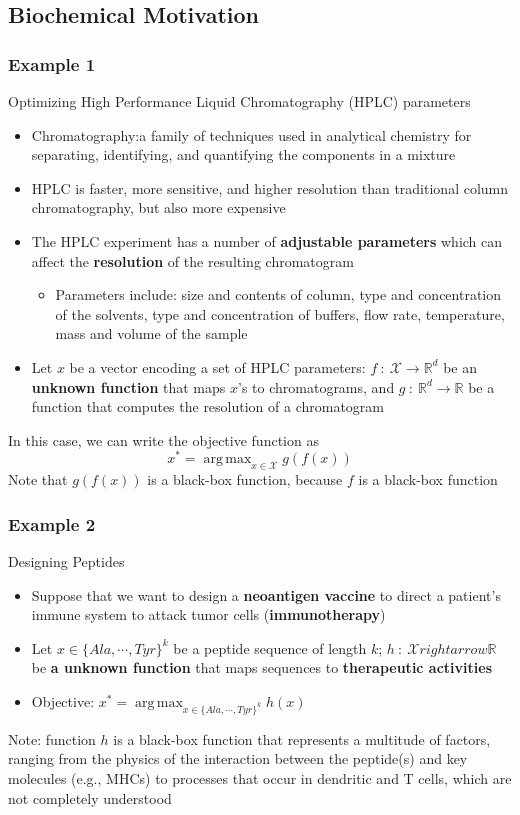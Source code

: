 \documentclass[10pt]{article}
\DeclareMathOperator*{\argmax}{arg\,max}
\begin{document}
\subsection*{Biochemical Motivation}
\subsubsection*{Example 1}
Optimizing High Performance Liquid Chromatography (HPLC) parameters
\begin{itemize}
	\item Chromatography:a family of techniques used in analytical chemistry for separating, identifying, and quantifying the components in a mixture
	\item HPLC is faster, more sensitive, and higher resolution than traditional column chromatography, but also more expensive
	\item The HPLC experiment has a number of \textbf{adjustable parameters} which can affect the \textbf{resolution} of the resulting chromatogram
	\begin{itemize}
	    \item Parameters include: size and contents of column, type and concentration of the solvents, type and concentration of buffers, flow rate, temperature, mass and volume of the sample
    \end{itemize}
    \item Let $x$ be a vector encoding a set of HPLC parameters: $f \::\: \mathcal{X} \rightarrow \mathbb{R}^d$ be an \textbf{unknown function} that maps $x$'s to chromatograms, and $g \::\: \mathbb{R}^d \rightarrow \mathbb{R}$ be a function that computes the resolution of a chromatogram
\end{itemize}
In this case, we can write the objective function as
\[x^* = \argmax_{x \in \mathcal{X}} g\left(f(x)\right)\]
Note that $g\left(f(x)\right)$ is a black-box function, because $f$ is a black-box function

\subsubsection*{Example 2}
Designing Peptides
\begin{itemize}
	\item Suppose that we want to design a \textbf{neoantigen vaccine} to direct a patient's immune system to attack tumor cells (\textbf{immunotherapy})
	\item Let $x \in \{Ala, \cdots, Tyr\}^k$ be a peptide sequence of length $k$; $h \::\: \mathcal{X} rightarrow \mathbb{R}$ be \textbf{a unknown function} that maps sequences to \textbf{therapeutic activities}
	\item Objective: $x^* = \argmax_{x \in \{Ala, \cdots, Tyr\}^k} h(x)$
\end{itemize}
Note: function $h$ is a black-box function that represents a multitude of factors, ranging from the physics of the interaction between the peptide(s) and key molecules (e.g., MHCs) to processes that occur in dendritic and T cells, which are not completely understood
\end{document}

